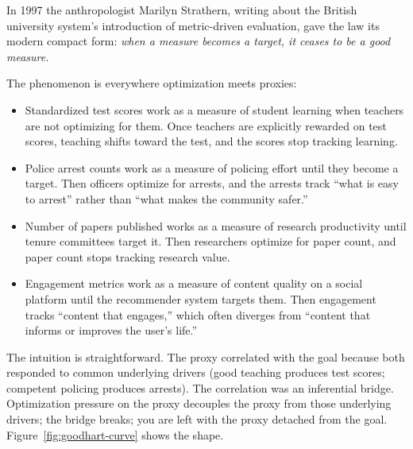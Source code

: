 In 1997 the anthropologist Marilyn Strathern, writing about the British university system's introduction of metric-driven evaluation, gave the law its modern compact form: \emph{when a measure becomes a target, it ceases to be a good measure.}

The phenomenon is everywhere optimization meets proxies:

\begin{itemize}
\item Standardized test scores work as a measure of student learning when teachers are not optimizing for them. Once teachers are explicitly rewarded on test scores, teaching shifts toward the test, and the scores stop tracking learning.
\item Police arrest counts work as a measure of policing effort until they become a target. Then officers optimize for arrests, and the arrests track ``what is easy to arrest'' rather than ``what makes the community safer.''
\item Number of papers published works as a measure of research productivity until tenure committees target it. Then researchers optimize for paper count, and paper count stops tracking research value.
\item Engagement metrics work as a measure of content quality on a social platform until the recommender system targets them. Then engagement tracks ``content that engages,'' which often diverges from ``content that informs or improves the user's life.''
\end{itemize}

The intuition is straightforward. The proxy correlated with the goal because both responded to common underlying drivers (good teaching produces test scores; competent policing produces arrests). The correlation was an inferential bridge. Optimization pressure on the proxy decouples the proxy from those underlying drivers; the bridge breaks; you are left with the proxy detached from the goal. Figure~\ref{fig:goodhart-curve} shows the shape.

